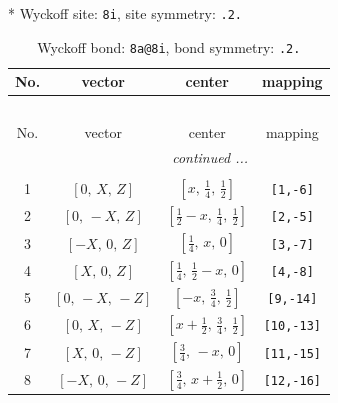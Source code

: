 \documentclass[fleqn,8pt]{jsarticle}
\begin{document}
* Wyckoff site: {\tt 8i}, site symmetry: {\tt .2.}
\renewcommand{\arraystretch}{1.2}
\begin{longtable}{cccc}
\caption{Wyckoff bond: {\tt 8a@8i}, bond symmetry: {\tt .2.}}
 \\
 \hline \hline
No. & vector & center & mapping \\ \hline \endfirsthead

\multicolumn{3}{l}{\tablename\ \thetable{}} \\
 \hline \hline
No. & vector & center & mapping \\ \hline \endhead

 \hline \hline
\multicolumn{3}{r}{\footnotesize\it continued ...} \\ \endfoot

 \hline \hline
\multicolumn{3}{r}{} \\ \endlastfoot

1 & $\left[ 0,\, X,\, Z \right]$ & $\left[ x,\, \frac{1}{4},\, \frac{1}{2} \right]$ & {\tt [1,-6]} \\ \hline
2 & $\left[ 0,\, - X,\, Z \right]$ & $\left[ \frac{1}{2} - x,\, \frac{1}{4},\, \frac{1}{2} \right]$ & {\tt [2,-5]} \\ \hline
3 & $\left[ - X,\, 0,\, Z \right]$ & $\left[ \frac{1}{4},\, x,\, 0 \right]$ & {\tt [3,-7]} \\ \hline
4 & $\left[ X,\, 0,\, Z \right]$ & $\left[ \frac{1}{4},\, \frac{1}{2} - x,\, 0 \right]$ & {\tt [4,-8]} \\ \hline
5 & $\left[ 0,\, - X,\, - Z \right]$ & $\left[ - x,\, \frac{3}{4},\, \frac{1}{2} \right]$ & {\tt [9,-14]} \\ \hline
6 & $\left[ 0,\, X,\, - Z \right]$ & $\left[ x + \frac{1}{2},\, \frac{3}{4},\, \frac{1}{2} \right]$ & {\tt [10,-13]} \\ \hline
7 & $\left[ X,\, 0,\, - Z \right]$ & $\left[ \frac{3}{4},\, - x,\, 0 \right]$ & {\tt [11,-15]} \\ \hline
8 & $\left[ - X,\, 0,\, - Z \right]$ & $\left[ \frac{3}{4},\, x + \frac{1}{2},\, 0 \right]$ & {\tt [12,-16]} \\
\end{longtable}
\renewcommand{\arraystretch}{1.2}
\end{document}
